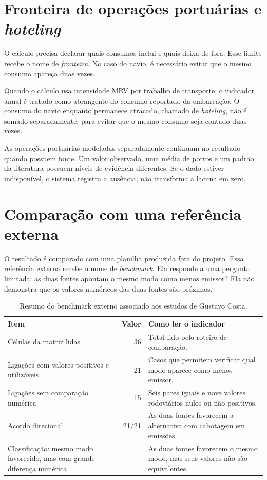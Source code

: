 \section{Fronteira de operações portuárias e \emph{hoteling}}
\label{sec:app-nota-portops-hoteling}

O cálculo precisa declarar quais consumos inclui e quais deixa de fora. Esse limite recebe o nome de \emph{fronteira}. No caso do navio, é necessário evitar que o mesmo consumo apareça duas vezes.

Quando o cálculo usa intensidade MRV por trabalho de transporte, o indicador anual é tratado como abrangente do consumo reportado da embarcação. O consumo do navio enquanto permanece atracado, chamado de \emph{hoteling}, não é somado separadamente, para evitar que o mesmo consumo seja contado duas vezes.

As operações portuárias modeladas separadamente continuam no resultado quando possuem fonte. Um valor observado, uma média de portos e um padrão da literatura possuem níveis de evidência diferentes. Se o dado estiver indisponível, o sistema registra a ausência; não transforma a lacuna em zero.

\section{Comparação com uma referência externa}
\label{sec:app-benchmark}

O resultado é comparado com uma planilha produzida fora do projeto. Essa referência externa recebe o nome de \emph{benchmark}. Ela responde a uma pergunta limitada: as duas fontes apontam o mesmo modo como menos emissor? Ela não demonstra que os valores numéricos das duas fontes são próximos.

\begin{table}[htbp]
\centering
\small
\caption{Resumo do benchmark externo associado aos estudos de Gustavo Costa.}
\label{tab:app-benchmark-resumo}
\begin{tabularx}{\textwidth}{L{0.40\textwidth}r Y}
\toprule
Item & Valor & Como ler o indicador \\
\midrule
Células da matriz lidas & \num{36} & Total lido pelo roteiro de comparação.\\
Ligações com valores positivos e utilizáveis & \num{21} & Casos que permitem verificar qual modo aparece como menos emissor.\\
Ligações sem comparação numérica & \num{15} & Seis pares iguais e nove valores rodoviários nulos ou não positivos.\\
Acordo direcional & 21/21 & As duas fontes favorecem a alternativa com cabotagem em emissões.\\
Classificação: mesmo modo favorecido, mas com grande diferença numérica &  & As duas fontes favorecem o mesmo modo, mas seus valores não são equivalentes.\\
\bottomrule
\end{tabularx}
\end{table}

